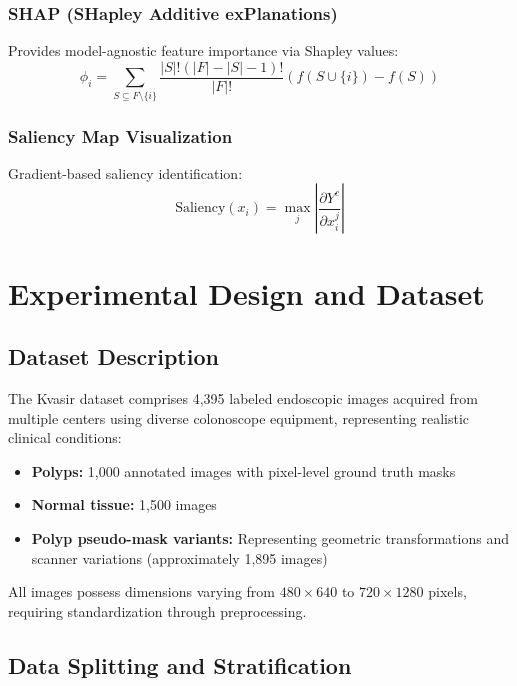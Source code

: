 \documentclass[11pt,a4paper]{article}
\begin{document}
\subsubsection{SHAP (SHapley Additive exPlanations)}
Provides model-agnostic feature importance via Shapley values:
\begin{equation}
\phi_i = \sum_{S \subseteq F \setminus \{i\}} \frac{|S|!(|F|-|S|-1)!}{|F|!}(f(S \cup \{i\}) - f(S))
\end{equation}

\subsubsection{Saliency Map Visualization}
Gradient-based saliency identification:
\begin{equation}
\text{Saliency}(x_i) = \max_j \left|\frac{\partial Y^c}{\partial x_i^j}\right|
\end{equation}

\section{Experimental Design and Dataset}
\label{sec:experimental}

\subsection{Dataset Description}

The Kvasir dataset comprises 4,395 labeled endoscopic images acquired from multiple centers using diverse colonoscope equipment, representing realistic clinical conditions:
\begin{itemize}
\item \textbf{Polyps:} 1,000 annotated images with pixel-level ground truth masks
\item \textbf{Normal tissue:} 1,500 images
\item \textbf{Polyp pseudo-mask variants:} Representing geometric transformations and scanner variations (approximately 1,895 images)
\end{itemize}

All images possess dimensions varying from $480 \times 640$ to $720 \times 1280$ pixels, requiring standardization through preprocessing.

\subsection{Data Splitting and Stratification}
\end{document}
